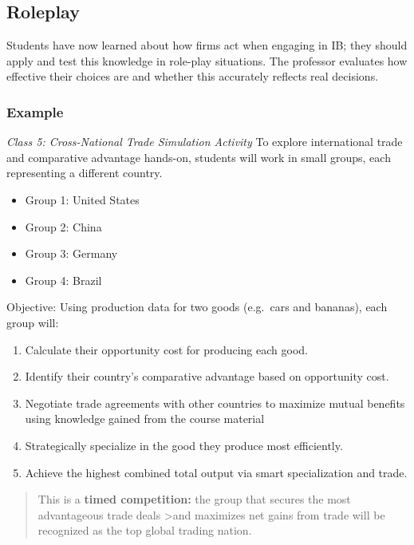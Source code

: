 \documentclass[
  11pt,
]{article}
\providecommand{\tightlist}{%
  \setlength{\itemsep}{0pt}\setlength{\parskip}{0pt}}
\begin{document}
\subsection{Roleplay}\label{roleplay}

Students have now learned about how firms act when engaging in IB; they
should apply and test this knowledge in role-play situations. The
professor evaluates how effective their choices are and whether this
accurately reflects real decisions.

\subsubsection{Example}\label{example}

\emph{Class 5: Cross-National Trade Simulation Activity} To explore
international trade and comparative advantage hands-on, students will
work in small groups, each representing a different country.

\begin{itemize}
\tightlist
\item
  Group 1: United States\\
\item
  Group 2: China\\
\item
  Group 3: Germany\\
\item
  Group 4: Brazil
\end{itemize}

Objective: Using production data for two goods (e.g.~cars and bananas),
each group will:

\begin{enumerate}
\def\labelenumi{\arabic{enumi}.}
\tightlist
\item
  Calculate their opportunity cost for producing each good.
\item
  Identify their country's comparative advantage based on opportunity
  cost.
\item
  Negotiate trade agreements with other countries to maximize mutual
  benefits using knowledge gained from the course material
\item
  Strategically specialize in the good they produce most efficiently.
\item
  Achieve the highest combined total output via smart specialization and
  trade.
\end{enumerate}

\begin{quote}
This is a \textbf{timed competition:} the group that secures the most
advantageous trade deals \textgreater and maximizes net gains from trade
will be recognized as the top global trading nation.
\end{quote}
\end{document}
